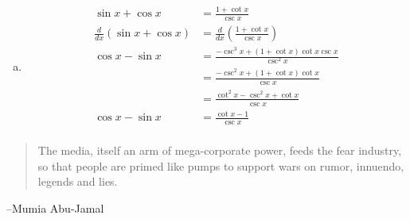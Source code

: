 \documentclass[letterpaper]{exam}
\begin{document}
\begin{description}
\begin{enumerate}[(a)]
        \item
          \begin{align*}
            \sin x + \cos x                  & = \frac{1 + \cot x }{\csc x} \\
            \frac{d}{dx} ( \sin x + \cos x ) & = \frac{d}{dx} \left( \frac{1 + \cot x }{\csc x}  \right) \\
            \cos x - \sin x                  & = \frac{ - \csc^3 x + (1 + \cot x) \cot x \csc x }{\csc^2 x} \\
                                             & = \frac{ - \csc^2 x + (1 + \cot x) \cot x }{\csc x} \\
                                             & = \frac{ \cot^2 x - \csc^2 x + \cot x }{\csc x} \\
            \cos x - \sin x                  & = \frac{ \cot x - 1 }{\csc x} \\
          \end{align*}
      \end{enumerate}

  \end{description}

  \else
    \vspace{10 cm}
    \begin{quote}
      \begin{em}
        The media, itself an arm of mega-corporate power, feeds the fear industry, so that people
        are primed like pumps to support wars on rumor, innuendo, legends and lies.
      \end{em}
    \end{quote}
    \hspace{2 cm} --Mumia Abu-Jamal
  \fi
\end{document}
